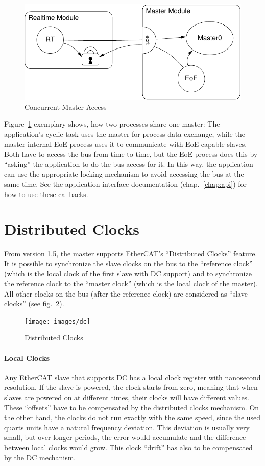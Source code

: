 \documentclass[a4paper,12pt,BCOR6mm,bibtotoc,idxtotoc]{scrbook}
\begin{document}
\begin{figure}[htbp]
  \centering
  \includegraphics[width=.6\textwidth]{images/master-locks}
  \caption{Concurrent Master Access}
  \label{fig:locks}
\end{figure}

Figure~\ref{fig:locks} exemplary shows, how two processes share one master:
The application's cyclic task uses the master for process data exchange, while
the master-internal EoE process uses it to communicate with EoE-capable
slaves. Both have to access the bus from time to time, but the EoE process
does this by ``asking'' the application to do the bus access for it. In this
way, the application can use the appropriate locking mechanism to avoid
accessing the bus at the same time. See the application interface
documentation (chap.~\ref{chap:api}) for how to use these callbacks.


\section{Distributed Clocks}
\label{sec:dc}

From version 1.5, the master supports EtherCAT's ``Distributed Clocks''
feature. It is possible to synchronize the slave clocks on the bus to the
``reference clock'' (which is the local clock of the first slave with DC
support) and to synchronize the reference clock to the ``master clock'' (which
is the local clock of the master). All other clocks on the bus (after the
reference clock) are considered as ``slave clocks'' (see fig.~\ref{fig:dc}).

\begin{figure}[htbp]
  \centering
  \texttt{[image: images/dc]}
  \caption{Distributed Clocks}
  \label{fig:dc}
\end{figure}

\paragraph{Local Clocks} Any EtherCAT slave that supports DC has a local clock
register with nanosecond resolution. If the slave is powered, the clock starts
from zero, meaning that when slaves are powered on at different times, their
clocks will have different values. These ``offsets'' have to be compensated by
the distributed clocks mechanism. On the other hand, the clocks do not run
exactly with the same speed, since the used quarts units have a natural
frequency deviation. This deviation is usually very small, but over longer
periods, the error would accumulate and the difference between local clocks
would grow. This clock ``drift'' has also to be compensated by the DC
mechanism.
\end{document}
